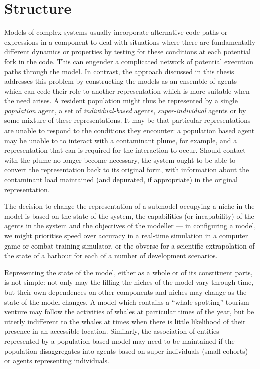 \section{Structure }
Models of complex systems usually incorporate alternative code paths
or expressions in a component to deal with situations where there are
fundamentally different dynamics or properties by testing for these
conditions at each potential fork in the code. This can engender a
complicated network of potential execution paths through the model.
In contrast, the approach discussed in this thesis addresses this
problem by constructing the models as an ensemble of agents which can
cede their role to another representation which is more suitable when
the need arises.  A resident population might thus be represented by a
single \emph{population} agent, a set of \emph{individual-based}
agents, \emph{super-individual} agents or by some mixture of these
representations.  It may be that particular representations are unable
to respond to the conditions they encounter: a population based agent
may be unable to to interact with a contaminant plume, for example,
and a representation that can is required for the interaction to
occur.  Should contact with the plume no longer become necessary, the
system ought to be able to convert the representation back to its
original form, with information about the contaminant load maintained
(and depurated, if appropriate) in the original representation.

The decision to change the representation of a submodel occupying a
niche in the model is based on the state of the system, the
capabilities (or incapability) of the agents in the system and the
objectives of the modeller --- in configuring a model, we might
prioritise speed over accuracy in a real-time simulation in a computer
game or combat training simulator, or the obverse for a scientific
extrapolation of the state of a harbour for each of a number of
development scenarios.

Representing the state of the model, either as a whole or of its
constituent parts, is not simple: not only may the filling the niches
of the model vary through time, but their own dependences on other
components and niches may change as the state of the model changes. A
model which contains a ``whale spotting'' tourism venture may follow
the activities of whales at particular times of the year, but be
utterly indifferent to the whales at times when there is little
likelihood of their presence in an accessible location. Similarly, the
association of entities represented by a population-based model may
need to be maintained if the population dis\-aggregates into agents
based on super-individuals (small cohorts) or agents representing
individuals.

